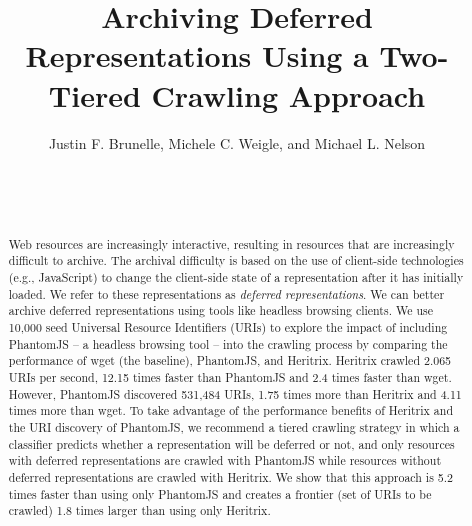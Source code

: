 \documentclass{ipres_proc_article-sp}
\begin{document}
\title{Archiving Deferred Representations Using a Two-Tiered Crawling Approach}


\author{
\alignauthor
Justin F. Brunelle, Michele C. Weigle, and Michael L. Nelson\\
       \\
       \\
       \\
}

\maketitle
\begin{abstract}
Web resources are increasingly interactive, resulting in resources that are increasingly difficult to archive. The archival difficulty is based on the use of client-side technologies (e.g., JavaScript) to change the client-side state of a representation after it has initially loaded. We refer to these representations as \emph{deferred representations}. We can better archive deferred representations using tools like headless browsing clients. 
We use 10,000 seed Universal Resource Identifiers (URIs) to explore the impact of including PhantomJS -- a headless browsing tool -- into the crawling process by comparing the performance of wget (the baseline), PhantomJS, and Heritrix. Heritrix crawled 2.065 URIs per second, 12.15 times faster than PhantomJS and 2.4 times faster than wget. However, PhantomJS discovered 531,484 URIs, 1.75 times more than Heritrix and 4.11 times more than wget. To take advantage of the performance benefits of Heritrix and the URI discovery of PhantomJS, we recommend a tiered crawling strategy in which a classifier predicts whether a representation will be deferred or not, and only resources with deferred representations are crawled with PhantomJS while resources without deferred representations are crawled with Heritrix. We show that this approach is 5.2 times faster than using only PhantomJS and creates a frontier (set of URIs to be crawled) 1.8 times larger than using only Heritrix.
\end{abstract}

\end{document}
